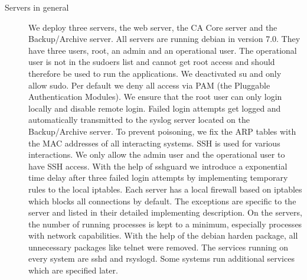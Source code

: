 \documentclass[a4paper, toc=index, 12pt, DIV14, twoside, BCOR2cm, headsepline, numbers=noenddot, bibliography=totoc]{scrbook}
\begin{document}
\begin{description}
\item[Servers in general ] We deploy three servers, the web server, the CA Core server and the Backup/Archive server. All servers are running debian in version 7.0. They have three users, root, an admin and an operational user. The operational user is not in the sudoers list and cannot get root access and should therefore be used to run the applications. We deactivated su and only allow sudo. Per default we deny all access via PAM (the Pluggable Authentication Modules). We ensure that the root user can only login locally and disable remote login. Failed login attempts get logged and automatically transmitted to the syslog server located on the Backup/Archive server. To prevent poisoning, we fix the ARP tables with the MAC addresses of all interacting systems. \newline
SSH is used for various interactions. We only allow the admin user and the operational user to have SSH access. With the help of sshguard we introduce a exponential time delay after three failed login attempts by implementing temporary rules to the local iptables.\newline
Each server has a local firewall based on iptables which blocks all connections by default. The exceptions are specific to the server and listed in their detailed implementing description.\newline
On the servers, the number of running processes is kept to a minimum, especially processes with network capabilities. With the help of the debian harden package, all unnecessary packages like telnet were removed. The services running on every system are sshd and rsyslogd. Some systems run additional services which are specified later. 


\end{description}
\end{document}
